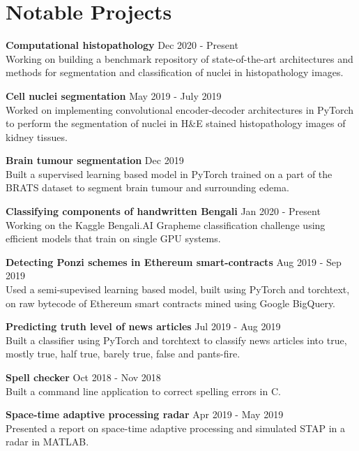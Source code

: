 \documentclass[letterpaper]{article}
\renewenvironment{itemize}{
  \begin{list}{}{
    \setlength{\leftmargin}{1.5em}
  }
}{
  \end{list}
}
\newcommand{\datefont}[1]{\textcolor{black!80}{\small{#1}}}
\begin{document}
\section*{Notable Projects}
  \begin{itemize}
    \item
    \textbf{Computational histopathology}
    \hfill{\datefont{Dec 2020 - Present}}\\
      Working on building a benchmark repository of state-of-the-art architectures and methods for segmentation and classification of nuclei in histopathology images.

    \item
    \textbf{Cell nuclei segmentation}
    \hfill{\datefont{May 2019 - July 2019}}\\
      Worked on implementing convolutional encoder-decoder architectures in PyTorch to perform the segmentation of nuclei in H\&E stained histopathology images of kidney tissues.

    \item
    \textbf{Brain tumour segmentation}
    \hfill{\datefont{Dec 2019}}\\
      Built a supervised learning based model in PyTorch trained on a part of the BRATS dataset to segment brain tumour and surrounding edema.

    \item
    \textbf{Classifying components of handwritten Bengali}
    \hfill{\datefont{Jan 2020 - Present}}\\
      Working on the Kaggle Bengali.AI Grapheme classification challenge
    using efficient models that train on single GPU systems.
    \item
    \textbf{Detecting Ponzi schemes in Ethereum smart-contracts}
    \hfill{\datefont{Aug 2019 - Sep 2019}}\\
      Used a semi-supevised learning based model, built using PyTorch and torchtext, on raw bytecode of Ethereum smart contracts mined using Google BigQuery.

    \item
    \textbf{Predicting truth level of news articles}
    \hfill{\datefont{Jul 2019 - Aug 2019}}\\
      Built a classifier using PyTorch and torchtext to classify news articles into true, mostly true, half true, barely true, false and pants-fire.

    \item
    \textbf{Spell checker}
    \hfill{\datefont{Oct 2018 - Nov 2018}}\\
      Built a command line application to correct spelling errors in C.

    \item
    \textbf{Space-time adaptive processing radar}
    \hfill{\datefont{Apr 2019 - May 2019}}\\
      Presented a report on space-time adaptive processing and simulated STAP in a radar in MATLAB.

  \end{itemize}
\end{document}
